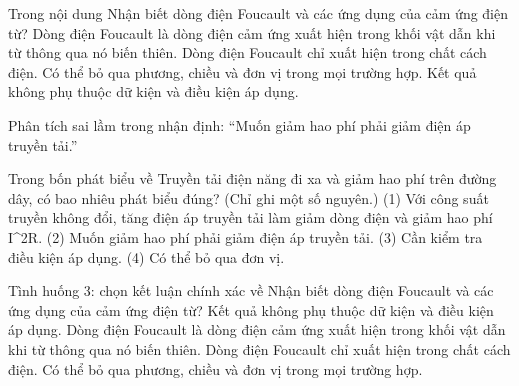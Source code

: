 \begin{ex}
Trong nội dung Nhận biết dòng điện Foucault và các ứng dụng của cảm ứng điện từ?
\choice
{\True Dòng điện Foucault là dòng điện cảm ứng xuất hiện trong khối vật dẫn khi từ thông qua nó biến thiên.}
{Dòng điện Foucault chỉ xuất hiện trong chất cách điện.}
{Có thể bỏ qua phương, chiều và đơn vị trong mọi trường hợp.}
{Kết quả không phụ thuộc dữ kiện và điều kiện áp dụng.}
\end{ex}

\begin{bt}
Phân tích sai lầm trong nhận định: “Muốn giảm hao phí phải giảm điện áp truyền tải.”
\end{bt}

\begin{ex}
Trong bốn phát biểu về Truyền tải điện năng đi xa và giảm hao phí trên đường dây, có bao nhiêu phát biểu đúng? (Chỉ ghi một số nguyên.) (1) Với công suất truyền không đổi, tăng điện áp truyền tải làm giảm dòng điện và giảm hao phí I^2R. (2) Muốn giảm hao phí phải giảm điện áp truyền tải. (3) Cần kiểm tra điều kiện áp dụng. (4) Có thể bỏ qua đơn vị.
\end{ex}

\begin{ex}
Tình huống 3: chọn kết luận chính xác về Nhận biết dòng điện Foucault và các ứng dụng của cảm ứng điện từ?
\choice
{Kết quả không phụ thuộc dữ kiện và điều kiện áp dụng.}
{\True Dòng điện Foucault là dòng điện cảm ứng xuất hiện trong khối vật dẫn khi từ thông qua nó biến thiên.}
{Dòng điện Foucault chỉ xuất hiện trong chất cách điện.}
{Có thể bỏ qua phương, chiều và đơn vị trong mọi trường hợp.}
\end{ex}

